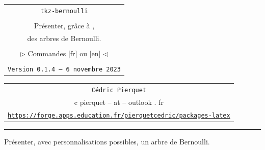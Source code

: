 \documentclass[french,11pt,a4paper]{article}
\def\TPversion{0.1.4}
\def\TPdate{6 novembre 2023}
\begin{document}
\pagestyle{fancy}

\thispagestyle{empty}

\begin{center}
	\begin{minipage}{0.88\linewidth}
	\begin{tcolorbox}[colframe=yellow,colback=yellow!15]
		\begin{center}
			\begin{tabular}{c}
				{\Huge \texttt{tkz-bernoulli}}\\
				\\
				{\LARGE Présenter, grâce à \MontreCode{tikz},} \\
				{\LARGE des arbres de Bernoulli.} \\
				\\
				{\LARGE $\rhd$ Commandes [fr] ou [en] $\lhd$} \\
				\\
				{\small \texttt{Version \TPversion{} -- \TPdate}}
		\end{tabular}
		\end{center}
	\end{tcolorbox}
\end{minipage}
\end{center}

\begin{center}
	\begin{tabular}{c}
		\texttt{Cédric Pierquet}\\
		{\ttfamily c pierquet -- at -- outlook . fr}\\
		\texttt{\url{https://forge.apps.education.fr/pierquetcedric/packages-latex}} \\
	\end{tabular}
\end{center}

\hrule

\vfill

Présenter, avec personnalisations possibles, un arbre de Bernoulli.

\vfill

\begin{tcolorbox}[colframe=lightgray,colback=white]

\hfill\tkzSchemBernoulli*\hfill~
\end{tcolorbox}

\vspace*{5mm}
\end{document}
